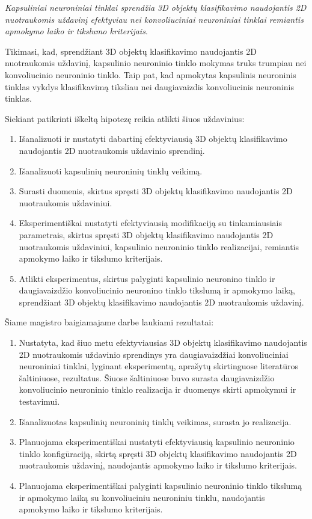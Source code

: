 \textit{Kapsuliniai neuroniniai tinklai sprendžia 3D objektų klasifikavimo naudojantis 2D nuotraukomis uždavinį efektyviau nei konvoliuciniai neuroniniai tinklai remiantis apmokymo laiko ir tikslumo kriterijais}.

Tikimasi, kad, sprendžiant 3D objektų klasifikavimo naudojantis 2D nuotraukomis uždavinį, kapsulinio neuroninio tinklo mokymas truks trumpiau nei konvoliucinio neuroninio tinklo. Taip pat, kad apmokytas kapsulinis neuroninis tinklas vykdys klasifikavimą tiksliau nei daugiavaizdis konvoliucinis neuroninis tinklas.

Siekiant patikrinti iškeltą hipotezę reikia atlikti šiuos uždavinius:

\begin{enumerate}
	\item Išanalizuoti ir nustatyti dabartinį efektyviausią 3D objektų klasifikavimo naudojantis 2D nuotraukomis uždavinio sprendinį.
	\item Išanalizuoti kapsulinių neuroninių tinklų veikimą.
	\item Surasti duomenis, skirtus spręsti 3D objektų klasifikavimo naudojantis 2D nuotraukomis uždaviniui.
	\item Eksperimentiškai nustatyti efektyviausią modifikaciją su tinkamiausiais parametrais, skirtus spręsti 3D objektų klasifikavimo naudojantis 2D nuotraukomis uždaviniui, kapsulinio neuroninio tinklo realizacijai, remiantis apmokymo laiko ir tikslumo kriterijais.
	\item Atlikti eksperimentus, skirtus palyginti kapsulinio neuronino tinklo ir daugiavaizdžio konvoliucinio neuronino tinklo tikslumą ir apmokymo laiką, sprendžiant 3D objektų klasifikavimo naudojantis 2D nuotraukomis uždavinį.
\end{enumerate}

Šiame magistro baigiamajame darbe laukiami rezultatai:

\begin{enumerate}
	\item Nustatyta, kad šiuo metu efektyviausias 3D objektų klasifikavimo naudojantis 2D nuotraukomis uždavinio sprendinys yra daugiavaizdžiai konvoliuciniai neuroniniai tinklai, lyginant eksperimentų, aprašytų skirtinguose literatūros šaltiniuose, rezultatus. Šiuose šaltiniuose buvo surasta daugiavaizdžio konvoliucinio neuroninio tinklo realizacija ir duomenys skirti apmokymui ir testavimui.
	\item Išanalizuotas kapsulinių neuroninių tinklų veikimas, surasta jo realizacija.
	\item Planuojama eksperimentiškai nustatyti efektyviausią kapsulinio neuroninio tinklo konfigūraciją, skirtą spręsti 3D objektų klasifikavimo naudojantis 2D nuotraukomis uždavinį, naudojantis apmokymo laiko ir tikslumo kriterijais.
	\item Planuojama eksperimentiškai palyginti kapsulinio neuroninio tinklo tikslumą ir apmokymo laiką su konvoliuciniu neuroniniu tinklu, naudojantis apmokymo laiko ir tikslumo kriterijais.
\end{enumerate}

